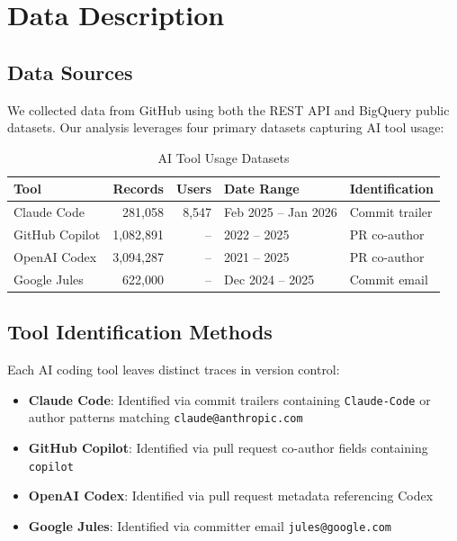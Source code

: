 \documentclass[11pt]{article}
\begin{document}
\section{Data Description}

\subsection{Data Sources}

We collected data from GitHub using both the REST API and BigQuery public datasets. Our analysis leverages four primary datasets capturing AI tool usage:

\begin{table}[H]
\centering
\caption{AI Tool Usage Datasets}
\label{tab:datasets}
\begin{tabular}{lrrll}
\toprule
\textbf{Tool} & \textbf{Records} & \textbf{Users} & \textbf{Date Range} & \textbf{Identification} \\
\midrule
Claude Code & 281,058 & 8,547 & Feb 2025 -- Jan 2026 & Commit trailer \\
GitHub Copilot & 1,082,891 & -- & 2022 -- 2025 & PR co-author \\
OpenAI Codex & 3,094,287 & -- & 2021 -- 2025 & PR co-author \\
Google Jules & 622,000 & -- & Dec 2024 -- 2025 & Commit email \\
\bottomrule
\end{tabular}
\end{table}

\subsection{Tool Identification Methods}

Each AI coding tool leaves distinct traces in version control:

\begin{itemize}
    \item \textbf{Claude Code}: Identified via commit trailers containing \texttt{Claude-Code} or author patterns matching \texttt{claude@anthropic.com}
    \item \textbf{GitHub Copilot}: Identified via pull request co-author fields containing \texttt{copilot}
    \item \textbf{OpenAI Codex}: Identified via pull request metadata referencing Codex
    \item \textbf{Google Jules}: Identified via committer email \texttt{jules@google.com}
\end{itemize}
\end{document}
